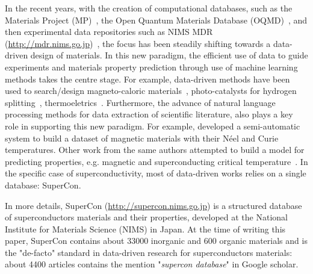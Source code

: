 \documentclass{article}
\begin{document}

In the recent years, with the creation of computational databases, such as the Materials Project (MP)~\cite{materialsprojectJain2013}, the Open Quantum Materials Database (OQMD)~\cite{oqmdkirklin2015open}, and then experimental data repositories such as NIMS MDR (\url{http://mdr.nims.go.jp})~\cite{ranganathan_anusha_2019_3553963}, the focus has been steadily shifting towards a data-driven design of materials. In this new paradigm, the efficient use of data to guide experiments and materials property prediction through use of machine learning methods takes the centre stage. 
For example, data-driven methods have been used to search/design magneto-caloric materials~\cite{Bocarsly2017,Castro2020,court2021inverse}, photo-catalysts for hydrogen splitting~\cite{xiong2021optimizing}, thermoeletrics~\cite{iwasaki2019machine}. 
Furthermore, the advance of natural language processing methods for data extraction of scientific literature, also plays a key role in supporting this new paradigm. 
For example, \cite{court2018auto} developed a semi-automatic system to build a dataset of magnetic materials with their Néel and Curie temperatures.  
Other work from the same authors attempted to build a model for predicting properties, e.g. magnetic and superconducting critical temperature~\cite{court_magnetic_2020}. In the specific case of superconductivity, most of data-driven works relies on a single database: SuperCon\cite{stanev_machine_2017, le2020critical,Hamlin2019SuperconductivityNR}.

In more details, SuperCon (\url{http://supercon.nims.go.jp}) is a structured database of superconductors materials and their properties, developed at the National Institute for Materials Science (NIMS) in Japan. 
At the time of writing this paper, SuperCon contains about 33000 inorganic and 600 organic materials and is the "de-facto" standard in data-driven research for superconductors materials: about 4400 articles contains the mention "\textit{supercon database}" in Google scholar. 
\end{document}
